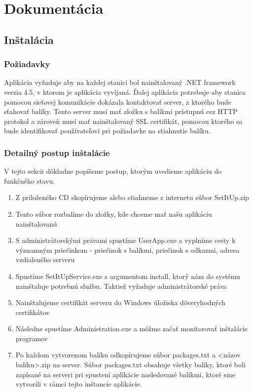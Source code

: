 \chapter{Dokumentácia}

\section{Inštalácia}
\subsection{Požiadavky}
Aplikácia vyžaduje aby na každej stanici bol nainštalovaný .NET framework verzia 4.5, v ktorom je aplikácia vyvíjaná. Ďalej aplikácia potrebuje aby stanica pomocou sieťovej komunikácie dokázala kontaktovať server, z ktorého bude sťahovať balíky. Tento server musí mať zložku s balíkmi prístupnú cez HTTP protokol a zároveň musí mať nainštalovaný SSL certifikát, pomocou ktorého sa bude identifikovať používateľovi pri požiadavke na stiahnutie balíku.

\subsection{Detailný postup inštalácie}
V tejto sekcii dôkladne popíšeme postup, ktorým uvedieme aplikáciu do funkčného stavu.
\begin{enumerate}
\item Z priloženého CD skopírujeme alebo stiahneme z internetu súbor SetItUp.zip
\item Tento súbor rozbalíme do zložky, kde chceme mať našu aplikáciu nainštalovanú
\item S administrátorskými právami spustíme UserApp.exe a vyplníme cesty k významným priečinkom - priečinok s balíkmi, priečinok s odkazmi, adresa vzdialeného serveru
\item Spustíme SetItUpService.exe s argumentom install, ktorý nám do systému nainštaluje potrebnú službu. Taktiež vyžaduje administrátorské práva
\item Nainštalujeme certifikát serveru do Windows úložiska dôveryhodných certifikátov
\item Následne spustíme Administration.exe a môžme začať monitorovať inštalácie programov
\item Po každom vytvorenom balíku odkopírujeme súbor packages.txt a \textless názov balíku\textgreater.zip na server. Súbor packages.txt obsahuje všetky balíky, ktoré boli zapísané na serveri pri spustení aplikácie nasledované balíkmi, ktoré sme vytvorili v rámci tejto inštancie aplikácie.
\end{enumerate}


